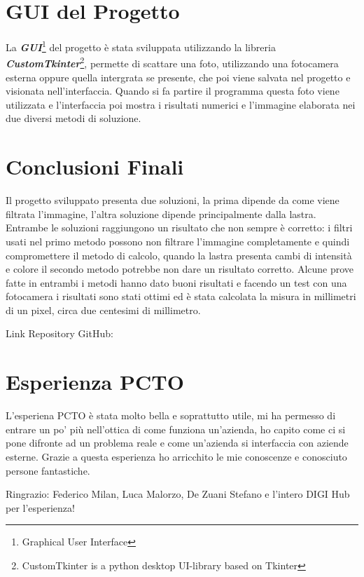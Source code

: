 \documentclass[a4paper, notitlepage, 12pt]{article}
\begin{document}
    \section{GUI del Progetto}
    \noindent La \emph{\textbf{GUI}}\footnote[12]{\indent Graphical User Interface} del progetto è stata sviluppata utilizzando la libreria \emph{\textbf{CustomTkinter}}\footnote[13]{\indent CustomTkinter is a python desktop UI-library based on Tkinter},
    permette di scattare una foto, utilizzando una fotocamera esterna oppure quella intergrata se presente, che poi viene salvata nel progetto e visionata nell'interfaccia.
    Quando si fa partire il programma questa foto viene utilizzata e l'interfaccia poi mostra i risultati numerici e l'immagine elaborata nei due diversi metodi di soluzione.
    \section{Conclusioni Finali}
    \noindent Il progetto sviluppato presenta due soluzioni, la prima dipende da come viene filtrata l'immagine, l'altra soluzione dipende principalmente dalla lastra.
    Entrambe le soluzioni raggiungono un risultato che non sempre è corretto: i filtri usati nel primo metodo possono non filtrare l'immagine completamente e quindi compromettere 
    il metodo di calcolo, quando la lastra presenta cambi di intensità e colore il secondo metodo potrebbe non dare un risultato corretto.
    Alcune prove fatte in entrambi i metodi hanno dato buoni risultati e facendo un test con una fotocamera i risultati sono stati ottimi ed è stata calcolata la misura in millimetri 
    di un pixel, circa due centesimi di millimetro.\par
    \noindent Link Repository GitHub: 
    \section{Esperienza PCTO}
    \noindent L'esperiena PCTO è stata molto bella e soprattutto utile, mi ha permesso di entrare un po' più nell'ottica di come funziona un'azienda, ho capito come ci si pone difronte ad un problema reale
    e come un'azienda si interfaccia con aziende esterne. Grazie a questa esperienza ho arricchito le mie conoscenze e conosciuto persone fantastiche.\par
    \noindent Ringrazio: Federico Milan, Luca Malorzo, De Zuani Stefano e l'intero DIGI Hub per l'esperienza!
\end{document}
